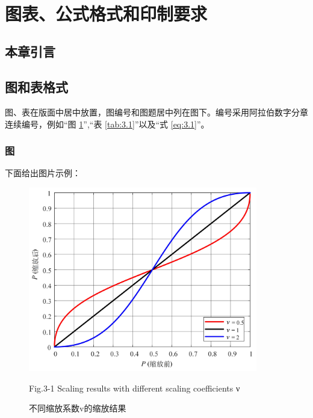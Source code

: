 \quad \\
\vspace{-20mm}

\section{图表、公式格式和印制要求}

\subsection{本章引言}

\subsection{图和表格式}

图、表在版面中居中放置，图编号和图题居中列在图下。编号采用阿拉伯数字分章连续编号，例如“图 \ref{fig:3.1}”,“表 \ref{tab:3.1}”以及“式 \ref{eq:3.1}”。

\subsubsection{图}
下面给出图片示例：

\vspace{-0.15cm}

\begin{figure}[h]
		\centering 
		\includegraphics[width=10cm]{chapters/chapter3/31.jpg}
		\caption{\wuhao 不同缩放系数v的缩放结果} 
		\label{fig:3.1} 
		\wuhao Fig.3-1 Scaling results with different scaling coefficients ν
\end{figure}

\vspace{-0.5cm}

